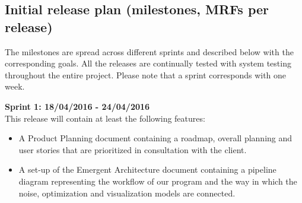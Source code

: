 \fi

\subsection{Initial release plan (milestones, MRFs per release)}
The milestones are spread across different sprints and described below with the corresponding goals. All the releases are continually tested with system testing throughout the entire project. Please note that a sprint corresponds with one week.

\textbf{Sprint 1: 18/04/2016 - 24/04/2016 } \\
This release will contain at least the following features:
\begin{itemize}
\item A Product Planning document containing a roadmap, overall planning and user stories that are prioritized in consultation with the client.
\item A set-up of the Emergent Architecture document containing a pipeline diagram representing the workflow of our program and the way in which the noise, optimization and visualization models are connected.
\end{itemize}

